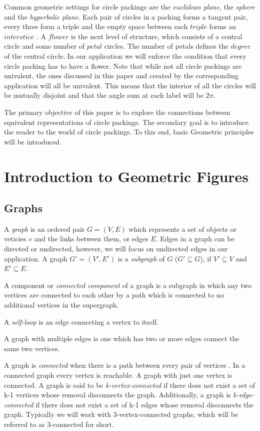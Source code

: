 \documentclass[11pt]{article}
\begin{document}
Common geometric settings for circle packings are the \emph{euclidean plane}, the \emph{sphere} and the \emph{hyperbolic plane}. Each pair of circles in a packing forms a tangent pair, every three form a triple and the empty space between each $triple$ forms an $interstice$ \cite{stephenson05introduction}. A $flower$ is the next level of structure, which consists of a central circle and some number of $petal$ circles. The number of petals defines the $degree$ of the central circle. In our application we will enforce the condition that every circle packing has to have a flower. Note that while not all circle packings are univalent, the ones discussed in this paper and created by the corresponding application will all be univalent. 
This means that the interior of all the circles will be mutually disjoint and that the angle sum at each label will be $2\pi$.

The primary objective of this paper is to explore the connections between equivalent representations of circle packings. The secondary goal is to introduce the reader to the world of circle packings. To this end, basic Geometric principles will be introduced.

\section{Introduction to Geometric Figures}
\subsection{Graphs}
A \emph{graph} is an ordered pair $G=(V,E)$ which represents a set of objects or veticies $v$ and the links between them, or edges $E$. Edges in a graph can be directed or undirected, however, we will focus on undirected edges in our application. A graph $G' = (V',E')$ is a \emph{subgraph} of $G$ ($G' \subseteq G$), if $V' \subseteq V$ and $E' \subseteq E$.

  A component or \emph{connected component} of a graph is a subgraph in which any two vertices are connected to each other by a path which is connected to no additional vertices in the supergraph.

  A \emph{self-loop} is an edge connecting a vertex to itself.
  
  A graph with multiple edges is one which has two or more edges connect the same two vertices.

  A graph is \emph{connected} when there is a path between every pair of vertices \cite{mathworld:ConnectedGraphs}. 
  In a connected graph every vertex is reachable. A graph with just one vertex is connected. A graph is said to be \emph{k-vertex-connected} if there does not exist a set of k-1 vertices whose removal disconnects the graph. Additionally, a graph is \emph{k-edge-connected} if there does not exist a set of k-1 edges whose removal disconnects the graph. Typically we will work with 3-vertex-connected graphs, which will be referred to as 3-connected for short.
  
\end{document}
